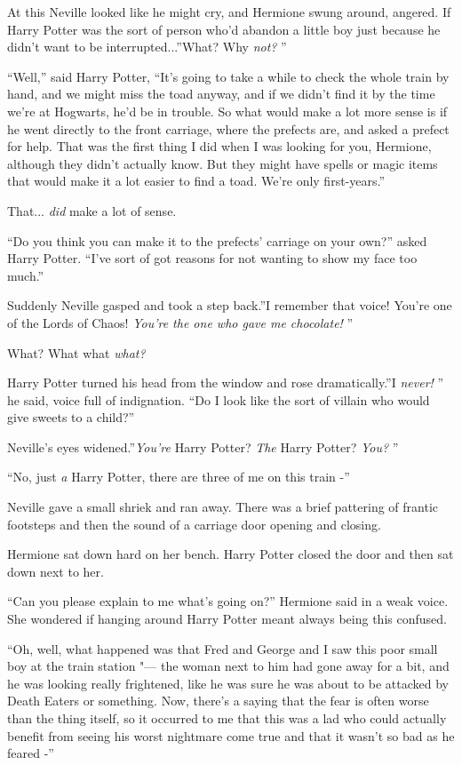 At this Neville looked like he might cry, and Hermione swung around,
angered. If Harry Potter was the sort of person who'd abandon a little
boy just because he didn't want to be interrupted...''What? Why
\emph{not?} ''

``Well,'' said Harry Potter, ``It's going to take a while to check the
whole train by hand, and we might miss the toad anyway, and if we didn't
find it by the time we're at Hogwarts, he'd be in trouble. So what would
make a lot more sense is if he went directly to the front carriage,
where the prefects are, and asked a prefect for help. That was the first
thing I did when I was looking for you, Hermione, although they didn't
actually know. But they might have spells or magic items that would make
it a lot easier to find a toad. We're only first-years.''

That... \emph{did} make a lot of sense.

``Do you think you can make it to the prefects' carriage on your own?''
asked Harry Potter. ``I've sort of got reasons for not wanting to show
my face too much.''

Suddenly Neville gasped and took a step back.''I remember that voice!
You're one of the Lords of Chaos! \emph{You're the one who gave me
chocolate!} ''

What? What what \emph{what?}

Harry Potter turned his head from the window and rose dramatically.''I
\emph{never!} '' he said, voice full of indignation. ``Do I look like the
sort of villain who would give sweets to a child?''

Neville's eyes widened.''\emph{You're} Harry Potter? \emph{The} Harry
Potter? \emph{You?} ''

``No, just \emph{a} Harry Potter, there are three of me on this train -''

Neville gave a small shriek and ran away. There was a brief pattering of
frantic footsteps and then the sound of a carriage door opening and
closing.

Hermione sat down hard on her bench. Harry Potter closed the door and
then sat down next to her.

``Can you please explain to me what's going on?'' Hermione said in a
weak voice. She wondered if hanging around Harry Potter meant always
being this confused.

``Oh, well, what happened was that Fred and George and I saw this poor
small boy at the train station "--- the woman next to him had gone away for
a bit, and he was looking really frightened, like he was sure he was
about to be attacked by Death Eaters or something. Now, there's a saying
that the fear is often worse than the thing itself, so it occurred to me
that this was a lad who could actually benefit from seeing his worst
nightmare come true and that it wasn't so bad as he feared -''

